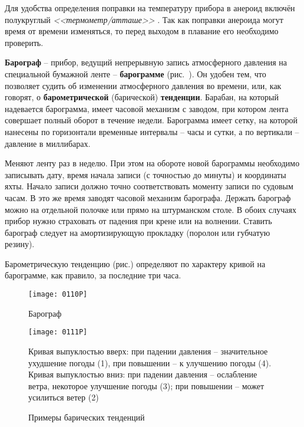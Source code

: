 Для удобства определения поправки на температуру прибора в анероид
включён полукруглый \textit{<<термометр\-/атташе>>}
. Так как поправки анероида могут время от
времени изменяться, то перед выходом в плавание его необходимо
проверить.

\textbf{Барограф} \--- прибор, ведущий непрерывную запись атмосферного
давления на специальной бумажной ленте \--- \textbf{барограмме}
(рис.~). Он удобен тем, что позволяет судить об изменении
атмосферного давления во времени, или, как говорят, о
\textbf{барометрической}
 (барической) \textbf{тенденции}. Барабан, на
который надевается барограмма, имеет часовой механизм с заводом, при
котором лента совершает полный оборот в течение недели. Барограмма
имеет сетку, на которой нанесены по горизонтали временные интервалы
\--- часы и сутки, а по вертикали \--- давление в миллибарах.

Меняют ленту раз в неделю. При этом на обороте новой барограммы
необходимо записывать дату, время начала записи (с точностью до
минуты) и координаты яхты. Начало записи должно точно соответствовать
моменту записи по судовым часам. В это же время заводят часовой
механизм барографа. Держать барограф можно на отдельной полочке или
прямо на штурманском столе. В обоих случаях прибор нужно страховать от
падения при крене или на волнении. Ставить барограф следует на
амортизирующую прокладку (поролон или губчатую резину).

Барометрическую тенденцию (рис.) определяют по характеру
кривой на барограмме, как правило, за последние три часа.

\begin{figure*}[!htb]
  \centering{}
  \texttt{[image: 0110P]}
  \caption{Барограф }
  \label{fig:110}
\end{figure*}

\begin{figure*}[!htb]
  \centering{}
  \texttt{[image: 0111P]}
  \caption{Примеры барических тенденций}
  \label{fig:111}
  \small \centering{} Кривая выпуклостью вверх: при падении давления
  \--- значительное ухудшение погоды (1), при повышении \--- к
  улучшению погоды (4). Кривая выпуклостью вниз: при падении давления
  \--- ослабление ветра, некоторое улучшение погоды (3); при повышении
  \--- может усилиться ветер (2)
\end{figure*}

